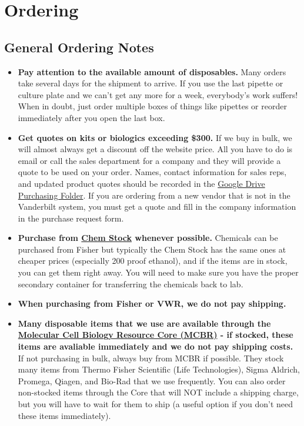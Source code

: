 \documentclass[
]{book}
\begin{document}
\hypertarget{ordering}{%
\chapter{Ordering}\label{ordering}}

\hypertarget{general-ordering-notes}{%
\section{General Ordering Notes}\label{general-ordering-notes}}

\begin{itemize}
\item
  \textbf{Pay attention to the available amount of disposables.} Many orders take several days for the shipment to arrive. If you use the last pipette or culture plate and we can't get any more for a week, everybody's work suffers! When in doubt, just order multiple boxes of things like pipettes or reorder immediately after you open the last box.
\item
  \textbf{Get quotes on kits or biologics exceeding \$300.} If we buy in bulk, we will almost always get a discount off the website price. All you have to do is email or call the sales department for a company and they will provide a quote to be used on your order. Names, contact information for sales reps, and updated product quotes should be recorded in the \href{https://drive.google.com/file/d/1MHIqY_gJsaVwZvy92M90tAaFEfcg_pQw/view?usp=sharing}{Google Drive Purchasing Folder}. If you are ordering from a new vendor that is not in the Vanderbilt system, you must get a quote and fill in the company information in the purchase request form.
\item
  \textbf{Purchase from \protect\hyperlink{chemstock}{Chem Stock} whenever possible.} Chemicals can be purchased from Fisher but typically the Chem Stock has the same ones at cheaper prices (especially 200 proof ethanol), and if the items are in stock, you can get them right away. You will need to make sure you have the proper secondary container for transferring the chemicals back to lab.
\item
  \textbf{When purchasing from Fisher or VWR, we do not pay shipping.}
\item
  \textbf{Many disposable items that we use are available through the \protect\hyperlink{core}{Molecular Cell Biology Resource Core (MCBR)} - if stocked, these items are avaliable immediately and we do not pay shipping costs.} If not purchasing in bulk, always buy from MCBR if possible. They stock many items from Thermo Fisher Scientific (Life Technologies), Sigma Aldrich, Promega, Qiagen, and Bio-Rad that we use frequently. You can also order non-stocked items through the Core that will NOT include a shipping charge, but you will have to wait for them to ship (a useful option if you don't need these items immediately).

\end{itemize}
\end{document}
